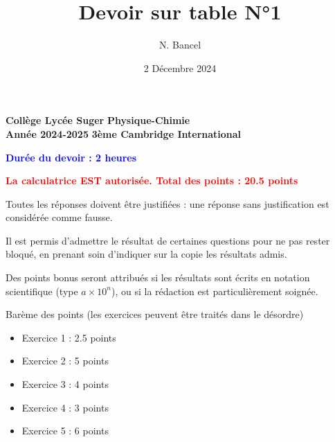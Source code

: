 \documentclass{exam}
\title{Devoir sur table N°1}
\author{N. Bancel}
\date{2 Décembre 2024}
\begin{document}
\textbf{Collège Lycée Suger}
\hfill
\textbf{Physique-Chimie} \\

\textbf{Année 2024-2025}
\hfill
\textbf{3ème Cambridge International} \par

{\let\newpage\relax\maketitle}


  \begin{center}
    \textbf{\textcolor{blue}{Durée du devoir : 2 heures}} \par
    \vspace{1em}
    \textbf{\textcolor{red}{La calculatrice EST autorisée. Total des points : 20.5 points}} \par
    \vspace{1em}
  \end{center}
  
  \begin{tcolorbox}[colback=gray!10!white, colframe=gray, title=Note importante]
    Toutes les réponses doivent être justifiées : une réponse sans justification est considérée comme fausse. \par
    \vspace{1em}
    Il est permis d'admettre le résultat de certaines questions pour ne pas rester bloqué, en prenant soin d'indiquer sur la copie les résultats admis. \par
    \vspace{1em}
    Des points bonus seront attribués si les résultats sont écrits en notation scientifique (type $a \times 10^n$), ou si la rédaction est particulièrement soignée. \par
    \vspace{1em}
    Barème des points (les exercices peuvent être traités dans le désordre)
    \begin{itemize}
      \item Exercice 1 : 2.5 points
      \item Exercice 2 : 5 points
      \item Exercice 3 : 4 points
      \item Exercice 4 : 3 points
      \item Exercice 5 : 6 points
  \end{itemize}
  \end{tcolorbox}
\end{document}
